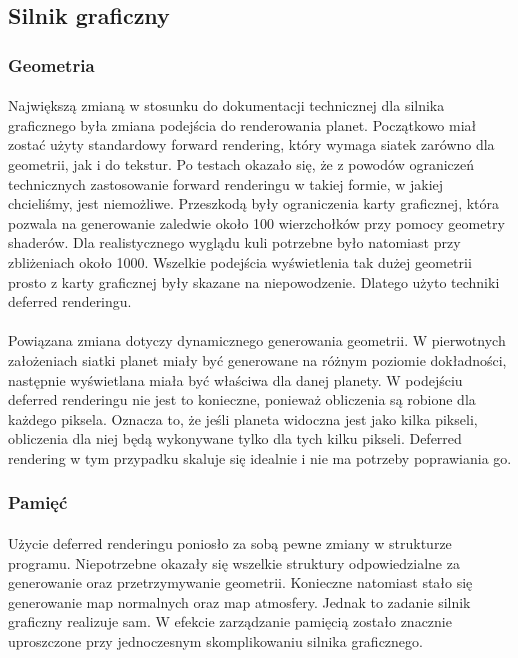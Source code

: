 \subsection{Silnik graficzny}\label{sub:silnik graficzny}
\subsubsection{Geometria}\label{ssub:geometria}
\paragraph{}

Największą zmianą w stosunku do dokumentacji technicznej dla silnika graficznego była zmiana podejścia do renderowania planet. Początkowo miał zostać użyty standardowy forward rendering, który wymaga siatek zarówno dla geometrii, jak i do tekstur. Po testach okazało się, że z powodów ograniczeń technicznych zastosowanie forward renderingu w takiej formie, w jakiej chcieliśmy, jest niemożliwe. Przeszkodą były ograniczenia karty graficznej, która pozwala na generowanie zaledwie około 100 wierzchołków przy pomocy geometry shaderów. Dla realistycznego wyglądu kuli potrzebne było natomiast przy zbliżeniach około 1000. Wszelkie podejścia wyświetlenia tak dużej geometrii prosto z karty graficznej były skazane na niepowodzenie. Dlatego użyto techniki deferred renderingu.
\paragraph{}
Powiązana zmiana dotyczy dynamicznego generowania geometrii. W pierwotnych założeniach siatki planet miały być generowane na różnym poziomie dokładności, następnie wyświetlana miała być właściwa dla danej planety. W podejściu deferred renderingu nie jest to konieczne, ponieważ obliczenia są robione dla każdego piksela. Oznacza to, że jeśli planeta widoczna jest jako kilka pikseli, obliczenia dla niej będą wykonywane tylko dla tych kilku pikseli. Deferred rendering w tym przypadku skaluje się idealnie i nie ma potrzeby poprawiania go.

\subsubsection{Pamięć}\label{ssub:pamiec}
\paragraph{}

Użycie deferred renderingu poniosło za sobą pewne zmiany w strukturze programu. Niepotrzebne okazały się wszelkie struktury odpowiedzialne za generowanie oraz przetrzymywanie geometrii. Konieczne natomiast stało się generowanie map normalnych oraz map atmosfery. Jednak to zadanie silnik graficzny realizuje sam. W efekcie zarządzanie pamięcią zostało znacznie uproszczone przy jednoczesnym skomplikowaniu silnika graficznego.

